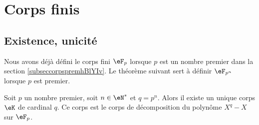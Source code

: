 
\section{Corps finis}
\label{SecCorpsFinizkAcbS}

\subsection{Existence, unicité}

Nous avons déjà défini le corps fini \( \eF_p\) lorsque \( p\) est un nombre premier dans la section \ref{subseccorpspremhBlYIv}. Le théorème suivant sert à définir \( \eF_{p^n}\) lorsque \( p\) est premier.
\begin{theorem}     \label{ThoOzgSfy}
    Soit \( p\) un nombre premier, soit \( n\in \eN^*\) et \( q=p^n\). Alors il existe un unique corps \( \eK\) de cardinal \( q\). Ce corps est le corps de décomposition du polynôme \( X^q-X\) sur \( \eF_p\).
\end{theorem}

